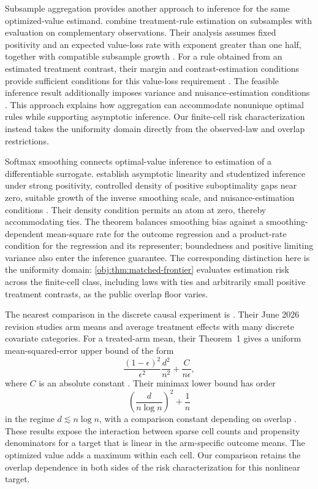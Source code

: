\documentclass[11pt]{article}
\begin{document}
Subsample aggregation provides another approach to inference for the same optimized-value estimand. \citet[Theorems~2--3]{Shi2020} combine treatment-rule estimation on subsamples with evaluation on complementary observations. Their analysis assumes fixed positivity and an expected value-loss rate with exponent greater than one half, together with compatible subsample growth \citep[conditions~(A3)--(A4)]{Shi2020}. For a rule obtained from an estimated treatment contrast, their margin and contrast-estimation conditions provide sufficient conditions for this value-loss requirement \citep[conditions~(A5)--(A6)]{Shi2020}. The feasible inference result additionally imposes variance and nuisance-estimation conditions \citep[Theorem~3 and equations~(9)--(11)]{Shi2020}. This approach explains how aggregation can accommodate nonunique optimal rules while supporting asymptotic inference. Our finite-cell risk characterization instead takes the uniformity domain directly from the observed-law and overlap restrictions.

Softmax smoothing connects optimal-value inference to estimation of a differentiable surrogate. \citet[Theorem~3.3 and Corollary~3.4]{WhitehouseChenAusternSyrgkanis2025} establish asymptotic linearity and studentized inference under strong positivity, controlled density of positive suboptimality gaps near zero, suitable growth of the inverse smoothing scale, and nuisance-estimation conditions \citep[Assumptions~1--2]{WhitehouseChenAusternSyrgkanis2025}. Their density condition permits an atom at zero, thereby accommodating ties. The theorem balances smoothing bias against a smoothing-dependent mean-square rate for the outcome regression and a product-rate condition for the regression and its representer; boundedness and positive limiting variance also enter the inference guarantee. The corresponding distinction here is the uniformity domain: \cref{obj:thm:matched-frontier} evaluates estimation risk across the finite-cell class, including laws with ties and arbitrarily small positive treatment contrasts, as the public overlap floor varies.

The nearest comparison in the discrete causal experiment is \citet{ZengBalakrishnanHanKennedy2024Discrete}. Their June 2026 revision studies arm means and average treatment effects with many discrete covariate categories. For a treated-arm mean, their Theorem~1 gives a uniform mean-squared-error upper bound of the form
\[
\frac{(1-\epsilon)^2}{\epsilon^2}\frac{d^2}{n^2}
+\frac{C}{n\epsilon},
\]
where \(C\) is an absolute constant \citep[Theorem~1]{ZengBalakrishnanHanKennedy2024Discrete}. Their minimax lower bound has order
\[
\left(\frac{d}{n\log n}\right)^2+\frac{1}{n}
\]
in the regime \(d\lesssim n\log n\), with a comparison constant depending on overlap \citep[Theorem~2]{ZengBalakrishnanHanKennedy2024Discrete}. These results expose the interaction between sparse cell counts and propensity denominators for a target that is linear in the arm-specific outcome means. The optimized value adds a maximum within each cell. Our comparison retains the overlap dependence in both sides of the risk characterization for this nonlinear target.
\end{document}
